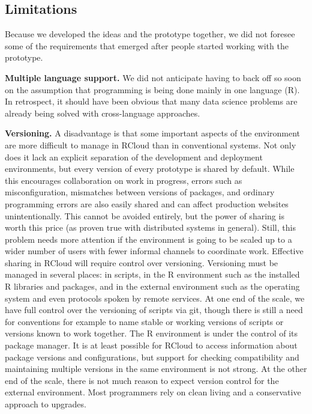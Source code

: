 \subsection{Limitations}

Because we developed the ideas and the prototype together,
we did not foresee some of the requirements that emerged
after people started working with the prototype.

{\bf Multiple language support.}
We did not anticipate having to back off so soon on the
assumption that programming is being done mainly in one
language (R). In retrospect, it should have been obvious
that many data science problems are already being solved
with cross-language approaches.

{\bf Versioning.}
A disadvantage is that some important aspects of the environment
are more difficult to manage in RCloud than in conventional systems.
Not only does it lack an explicit separation of the development and
deployment environments, but every version of every prototype is
shared by default. While this encourages collaboration on work
in progress, errors such as misconfiguration, mismatches between
versions of packages, and ordinary programming errors are also
easily shared and can affect production websites unintentionally.
This cannot be avoided entirely, but the power of sharing is worth
this price (as proven true with distributed systems in general).
Still, this problem needs more attention if the environment is
going to be scaled up to a wider number of users with fewer
informal channels to coordinate work. Effective sharing in RCloud
will require control over versioning.
Versioning must be managed in several places: in scripts, in the R environment
such as the installed R libraries and packages, and in the external
environment such as the operating system and even protocols spoken by
remote services. At one end of the scale, we have full control over the
versioning of scripts via git, though there is still a need for conventions
for example to name stable or working versions of scripts or versions known
to work together. The R environment is under the control of its package
manager. It is at least possible for RCloud to access information about
package versions and configurations, but support for checking compatibility
and maintaining multiple versions in the same environment is not strong.
At the other end of the scale, there is not much reason to expect version
control for the external environment. Most programmers rely on clean living
and a conservative approach to upgrades.

